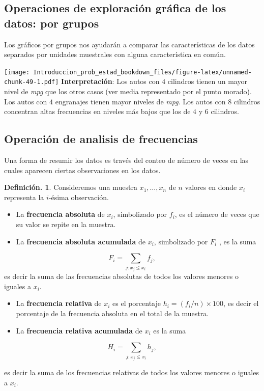 \documentclass[]{book}
\theoremstyle{definition}
\newtheorem{definition}{Definición.}[chapter]
\theoremstyle{definition}
\theoremstyle{definition}
\theoremstyle{remark}
\begin{document}
\hypertarget{operaciones-de-exploraciuxf3n-gruxe1fica-de-los-datos-por-grupos}{%
\subsection{Operaciones de exploración gráfica de los datos: por grupos}\label{operaciones-de-exploraciuxf3n-gruxe1fica-de-los-datos-por-grupos}}

Los gráficos por grupos nos ayudarán a comparar las
características de los datos separados por unidades
muestrales con alguna característica en común.

\texttt{[image: Introduccion\_prob\_estad\_bookdown\_files/figure-latex/unnamed-chunk-49-1.pdf]}
\textbf{Interpretación}: Los autos con \(4\) cilindros tienen
un mayor nivel
de \emph{mpg} que los otros casos (ver media representado por
el punto
morado). Los autos con \(4\) engranajes tienen mayor
niveles de \emph{mpg}.
Los autos con \(8\) cilindros concentran altas frecuencias
en niveles
más bajos que los de \(4\) y \(6\) cilindros.

\hypertarget{operaciuxf3n-de-analisis-de-frecuencias}{%
\subsection{Operación de analisis de frecuencias}\label{operaciuxf3n-de-analisis-de-frecuencias}}

Una forma de resumir los datos es través del conteo de
número de veces en las cuales aparecen
ciertas observaciones en los datos.

\begin{definition}
\protect\hypertarget{def:unnamed-chunk-50}{}{\label{def:unnamed-chunk-50} }Consideremos una muestra \(x_1, \ldots, x_n\) de \(n\)
valores en donde \(x_i\) representa la \(i\)-ésima
observación.

\begin{itemize}
\item
  La \textbf{frecuencia absoluta} de \(x_i\), simbolizado por
  \(f_i\), es el número de veces que su valor
  se repite en la muestra.
\item
  La \textbf{frecuencia absoluta acumulada} de \(x_i\),
  simbolizado por \(F_i\) , es la suma
\end{itemize}

\[F_i = \sum_{j: x_j \leq x_i} f_j,\]
es decir la suma de las frecuencias absolutas de todos
los valores menores o iguales a \(x_i\).

\begin{itemize}
\item
  La \textbf{frecuencia relativa} de \(x_i\) es el porcentaje
  \(h_i= (f_i/n)\times 100\), es decir el
  porcentaje de la frecuencia absoluta en el total de la
  muestra.
\item
  La \textbf{frecuencia relativa acumulada} de \(x_i\) es la
  suma
\end{itemize}

\[H_i = \sum_{j: x_j \leq x_i} h_j,\]

es decir la suma de los frecuencias relativas de todos
los valores
menores o iguales a \(x_i\).
\end{definition}
\end{document}
